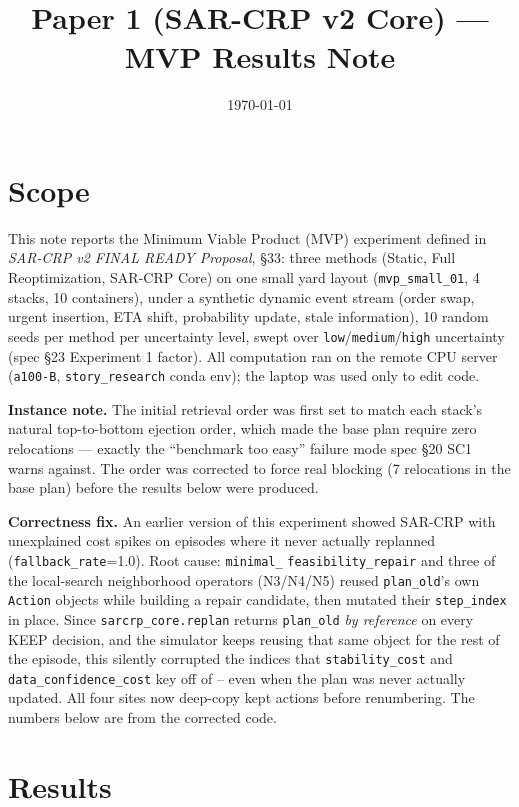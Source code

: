 \documentclass[11pt]{article}
\title{Paper 1 (SAR-CRP v2 Core) --- MVP Results Note}
\author{}
\date{\today}
\begin{document}
\maketitle

\section{Scope}

This note reports the Minimum Viable Product (MVP) experiment defined in
\emph{SAR-CRP v2 FINAL READY Proposal}, \S33: three methods (Static,
Full Reoptimization, SAR-CRP Core) on one small yard layout
(\texttt{mvp\_small\_01}, 4 stacks, 10 containers), under a synthetic
dynamic event stream (order swap, urgent insertion, ETA shift,
probability update, stale information), 10 random seeds per method per
uncertainty level, swept over \texttt{low}/\texttt{medium}/\texttt{high}
uncertainty (spec \S23 Experiment 1 factor). All computation ran on the
remote CPU server (\texttt{a100-B}, \texttt{story\_research} conda env);
the laptop was used only to edit code.

\textbf{Instance note.} The initial retrieval order was first set to match
each stack's natural top-to-bottom ejection order, which made the base plan
require zero relocations --- exactly the ``benchmark too easy'' failure
mode spec \S20 SC1 warns against. The order was corrected to force real
blocking (7 relocations in the base plan) before the results below were
produced.

\textbf{Correctness fix.} An earlier version of this experiment showed
SAR-CRP with unexplained cost spikes on episodes where it never actually
replanned (\texttt{fallback\_rate}=1.0). Root cause: \texttt{minimal\_}
\texttt{feasibility\_repair} and three of the local-search neighborhood
operators (N3/N4/N5) reused \texttt{plan\_old}'s own \texttt{Action}
objects while building a repair candidate, then mutated their
\texttt{step\_index} in place. Since \texttt{sarcrp\_core.replan} returns
\texttt{plan\_old} \emph{by reference} on every KEEP decision, and the
simulator keeps reusing that same object for the rest of the episode,
this silently corrupted the indices that \texttt{stability\_cost} and
\texttt{data\_confidence\_cost} key off of -- even when the plan was never
actually updated. All four sites now deep-copy kept actions before
renumbering. The numbers below are from the corrected code.

\section{Results}
\end{document}
